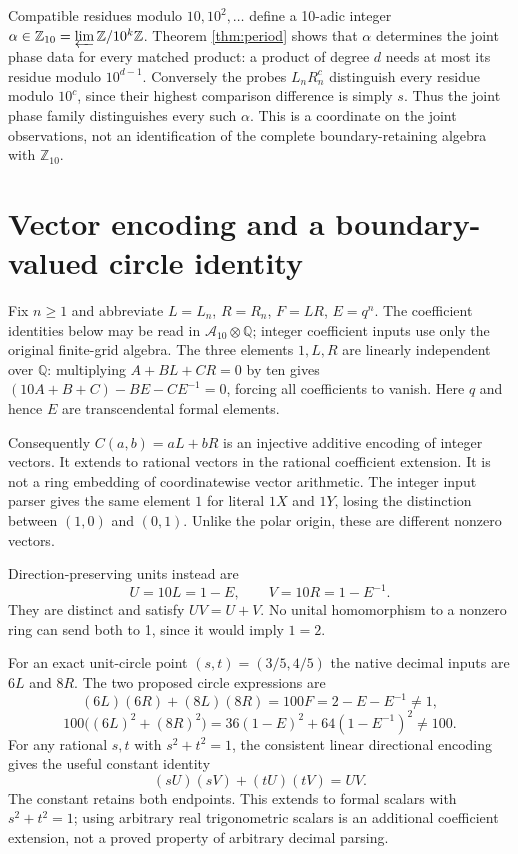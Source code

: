 \documentclass[11pt]{article}
\newcommand{\Z}{\mathbb Z}
\newcommand{\Q}{\mathbb Q}
\newcommand{\A}{\mathcal A}
\begin{document}
Compatible residues modulo $10,10^2,\ldots$ define a 10-adic integer
$\alpha\in\Z_{10}=\varprojlim\Z/10^k\Z$. Theorem \ref{thm:period}
shows that $\alpha$ determines the joint phase data for every matched
product: a product of degree $d$ needs at most its residue modulo
$10^{d-1}$. Conversely the probes $L_nR_n^c$ distinguish every residue
modulo $10^c$, since their highest comparison difference is simply $s$.
Thus the joint phase family distinguishes every such $\alpha$.
This is a coordinate on the joint observations, not an identification of
the complete boundary-retaining algebra with $\Z_{10}$.

\section{Vector encoding and a boundary-valued circle identity}
Fix $n\ge1$ and abbreviate $L=L_n$, $R=R_n$, $F=LR$, $E=q^n$.
The coefficient identities below may be read in $\A_{10}\otimes\Q$;
integer coefficient inputs use only the original finite-grid algebra.
The three elements $1,L,R$ are linearly independent over $\Q$: multiplying
$A+BL+CR=0$ by ten gives
$(10A+B+C)-BE-CE^{-1}=0$, forcing all coefficients to vanish.
Here $q$ and hence $E$ are transcendental formal elements.

Consequently $C(a,b)=aL+bR$ is an injective additive encoding of integer
vectors. It extends to rational vectors in the rational coefficient
extension. It is not a ring embedding of coordinatewise vector arithmetic.
The integer input parser gives the same element $1$ for literal $1X$ and
$1Y$, losing the distinction between $(1,0)$ and $(0,1)$.
Unlike the polar origin, these are different nonzero vectors.

Direction-preserving units instead are
\[
 U=10L=1-E,\qquad V=10R=1-E^{-1}.
\]
They are distinct and satisfy $UV=U+V$. No unital homomorphism to a
nonzero ring can send both to 1, since it would imply $1=2$.

For an exact unit-circle point $(s,t)=(3/5,4/5)$ the native decimal
inputs are $6L$ and $8R$. The two proposed circle expressions are
\[
 (6L)(6R)+(8L)(8R)=100F=2-E-E^{-1}\ne1,
\]
\[
 100\bigl((6L)^2+(8R)^2\bigr)
 =36(1-E)^2+64(1-E^{-1})^2\ne100.
\]
For any rational $s,t$ with $s^2+t^2=1$, the consistent linear
directional encoding gives the useful constant identity
\[
 (sU)(sV)+(tU)(tV)=UV.
\]
The constant retains both endpoints. This extends to formal scalars with
$s^2+t^2=1$; using arbitrary real trigonometric scalars is an additional
coefficient extension, not a proved property of arbitrary decimal parsing.
\end{document}
